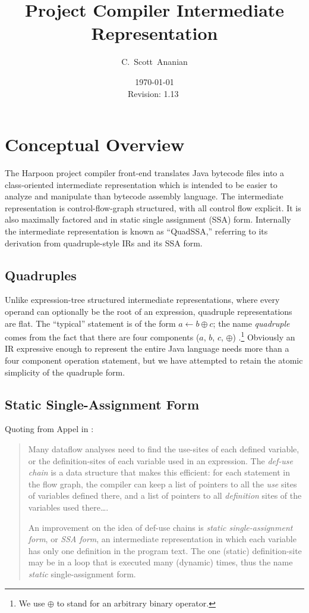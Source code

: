\documentclass[11pt,notitlepage,twocolumn,twoside]{article}
\author{C.~Scott~Ananian}
\title{\Harpoon{} Project Compiler Intermediate Representation}
\date{\today \\ $ $Revision: 1.13 $ $}
\newcommand{\Harpoon}{Harpoon}%
\begin{document}

\maketitle

\section{Conceptual Overview}

The \Harpoon{} project compiler front-end translates Java bytecode files
into a class-oriented intermediate representation which is intended to
be easier to analyze and manipulate than bytecode assembly language.
The intermediate representation is control-flow-graph structured, with
all control flow explicit.  It is also maximally factored and in
static single assignment (SSA) form.  Internally the intermediate
representation is known as ``QuadSSA,'' referring
to its derivation from quadruple-style IRs and its SSA form.

\subsection{Quadruples}
Unlike expression-tree structured intermediate representations, where
every operand can optionally be the root of an expression, quadruple
representations are flat.  The ``typical'' statement is of the form
$a \leftarrow b \oplus c$; the name \textit{quadruple} comes from the fact
that there are four components ($a$, $b$, $c$, $\oplus$)
\cite{appel:modern}.\footnote{We use $\oplus$ to stand for an arbitrary
binary operator.}  Obviously an IR expressive enough to represent the
entire Java language needs more than a four component operation
statement, but we have attempted to retain the atomic simplicity
of the quadruple form.

\subsection{Static Single-Assignment Form}

Quoting from Appel in \cite{appel:modern}:
\begin{quote}
Many dataflow analyses need to find the use-sites of each defined
variable, or the definition-sites of each variable used in an
expression.  The \textit{def-use chain} is a data structure that makes
this efficient: for each statement in the flow graph, the compiler can
keep a list of pointers to all the \textit{use} sites of variables
defined there, and a list of pointers to all \textit{definition} sites
of the variables used there\ldots .

An improvement on the idea of def-use chains is \textit{static
single-assignment form}, or \textit{SSA form}, an intermediate
representation in which each variable has only one definition in the
program text.  The one (static) definition-site may be in a loop that
is executed many (dynamic) times, thus the name \textit{static}
single-assignment form.
\end{quote}
\end{document}
